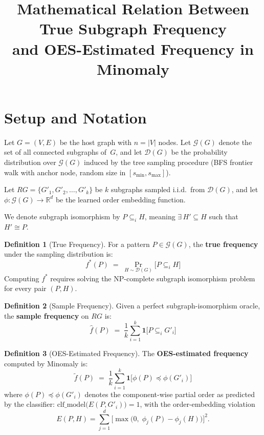 \documentclass[11pt,a4paper]{article}
\title{Mathematical Relation Between True Subgraph Frequency\\and OES-Estimated Frequency in Minomaly}
\author{}
\date{}
\theoremstyle{plain}
\theoremstyle{definition}
\newtheorem{definition}{Definition}
\newcommand{\freq}{\tilde{f}}
\newcommand{\fstar}{f^*}
\newcommand{\fhat}{\hat{f}}
\begin{document}
\maketitle

\section{Setup and Notation}

Let $G = (V, E)$ be the host graph with $n = |V|$ nodes. Let $\mathcal{G}(G)$ denote the set of all connected subgraphs of~$G$, and let $\mathcal{D}(G)$ be the probability distribution over $\mathcal{G}(G)$ induced by the tree sampling procedure (BFS frontier walk with anchor node, random size in $[s_{\min}, s_{\max}]$).

Let $RG = \{G'_1, G'_2, \ldots, G'_k\}$ be $k$ subgraphs sampled i.i.d.\ from $\mathcal{D}(G)$, and let $\phi : \mathcal{G}(G) \to \mathbb{R}^d$ be the learned order embedding function.

We denote subgraph isomorphism by $P \subseteq_i H$, meaning $\exists\, H' \subseteq H$ such that $H' \cong P$.

\begin{definition}[True Frequency]
For a pattern $P \in \mathcal{G}(G)$, the \textbf{true frequency} under the sampling distribution is:
\[
\fstar(P) \;=\; \Pr_{H \sim \mathcal{D}(G)}\!\big[P \subseteq_i H\big]
\]
Computing $\fstar$ requires solving the NP-complete subgraph isomorphism problem for every pair $(P, H)$.
\end{definition}

\begin{definition}[Sample Frequency]
Given a perfect subgraph-isomorphism oracle, the \textbf{sample frequency} on $RG$ is:
\[
\fhat(P) \;=\; \frac{1}{k}\sum_{i=1}^{k} \mathbf{1}\big[P \subseteq_i G'_i\big]
\]
\end{definition}

\begin{definition}[OES-Estimated Frequency]
The \textbf{OES-estimated frequency} computed by Minomaly is:
\[
\freq(P) \;=\; \frac{1}{k}\sum_{i=1}^{k} \mathbf{1}\big[\phi(P) \preceq \phi(G'_i)\big]
\]
where $\phi(P) \preceq \phi(G'_i)$ denotes the component-wise partial order as predicted by the classifier: $\text{clf\_model}\!\big(E(P, G'_i)\big) = 1$, with the order-embedding violation
\[
E(P, H) = \sum_{j=1}^{d} \big[\max\!\big(0,\; \phi_j(P) - \phi_j(H)\big)\big]^2.
\]
\end{definition}
\end{document}
